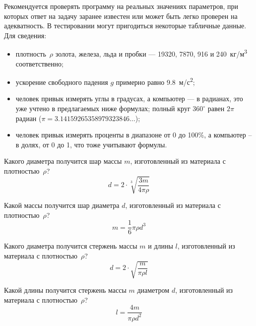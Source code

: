 Рекомендуется проверять программу на реальных значениях параметров, при
которых ответ на задачу заранее известен или может быть легко проверен на
адекватность. В тестировании могут пригодиться некоторые табличные данные.
Для сведения:
%
\begin{itemize}
%
\item плотность~$\rho$ золота, железа, льда и пробки ---
19320, 7870, 916 и 240~кг/м\textsuperscript{3} соответственно;
%
\item ускорение свободного падения $g$ примерно равно 
9.8~м/с\textsuperscript{2};
%
\item человек привык измерять углы в градусах, а компьютер ---
в радианах, это уже учтено в предлагаемых ниже формулах;
полный круг $360^{\circ}$ равен $2\pi$ радиан ($\pi = 3.14159265358979323846\dots$);
%
\item человек привык измерять проценты в диапазоне от 0 до 100\%,
а компьютер -- в долях, от 0 до 1, что тоже учитывают формулы.
\end{itemize}


\bigskip


\begin{zztask} 
Какого диаметра получится шар массы $m$, изготовленный из материала с
плотностью~$\rho$?
%
\[
d = 2\cdot \sqrt[3]{\frac{3m}{4\pi\rho}}
\]
\end{zztask}


\begin{zztask}
Какой массы получится шар диаметра $d$, изготовленный из материала с
плотностью~$\rho$?
%
\[
m = \frac{1}{6}\pi\rho d^3
\]
\end{zztask}


\begin{zztask}
Какого диаметра получится стержень массы $m$ и длины $l$, изготовленный из
материала с плотностью~$\rho$?
%
\[
d = 2\cdot \sqrt{\frac{m}{\pi\rho l}}
\]
\end{zztask}


\begin{zztask}
Какой длины получится стержень массы $m$ диаметром $d$, изготовленный из
материала с плотностью~$\rho$?
%
\[
l = \frac{4m}{\pi\rho d^2}
\]
\end{zztask}

